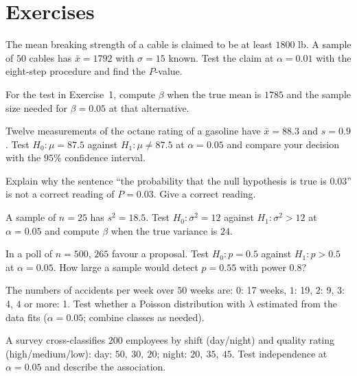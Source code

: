 \section{Exercises}

\begin{exercise}
The mean breaking strength of a cable is claimed to be at least $1800$ lb. A sample of $50$ cables has $\bar{x}=1792$ with $\sigma=15$ known. Test the claim at $\alpha=0.01$ with the eight-step procedure and find the $P$-value.
\end{exercise}

\begin{exercise}
For the test in Exercise~1, compute $\beta$ when the true mean is $1785$ and the sample size needed for $\beta=0.05$ at that alternative.
\end{exercise}

\begin{exercise}
Twelve measurements of the octane rating of a gasoline have $\bar{x}=88.3$ and $s=0.9$. Test $H_0:\mu=87.5$ against $H_1:\mu\ne87.5$ at $\alpha=0.05$ and compare your decision with the $95\%$ confidence interval.
\end{exercise}

\begin{exercise}
Explain why the sentence ``the probability that the null hypothesis is true is $0.03$'' is not a correct reading of $P=0.03$. Give a correct reading.
\end{exercise}

\begin{exercise}
A sample of $n=25$ has $s^2=18.5$. Test $H_0:\sigma^2=12$ against $H_1:\sigma^2>12$ at $\alpha=0.05$ and compute $\beta$ when the true variance is $24$.
\end{exercise}

\begin{exercise}
In a poll of $n=500$, $265$ favour a proposal. Test $H_0:p=0.5$ against $H_1:p>0.5$ at $\alpha=0.05$. How large a sample would detect $p=0.55$ with power $0.8$?
\end{exercise}

\begin{exercise}
The numbers of accidents per week over $50$ weeks are: $0$: 17 weeks, $1$: 19, $2$: 9, $3$: 4, $4$ or more: 1. Test whether a Poisson distribution with $\lambda$ estimated from the data fits ($\alpha=0.05$; combine classes as needed).
\end{exercise}

\begin{exercise}
A survey cross-classifies $200$ employees by shift (day/night) and quality rating (high/medium/low): day: $50,\ 30,\ 20$; night: $20,\ 35,\ 45$. Test independence at $\alpha=0.05$ and describe the association.
\end{exercise}
